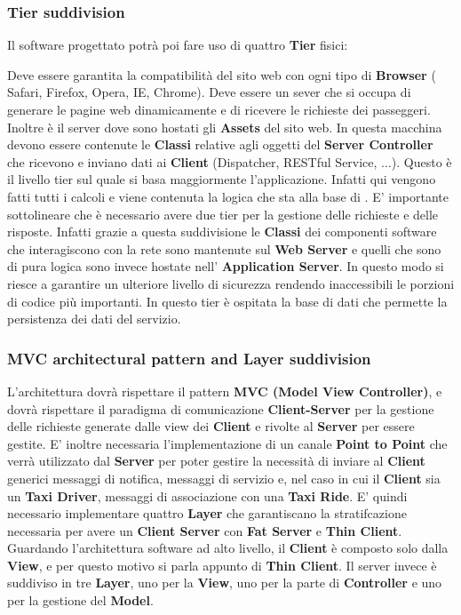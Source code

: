 \subsubsection{Tier suddivision}
Il software progettato potrà poi fare uso di quattro \textbf{Tier} fisici:
\begin{itemize}
	 Deve essere garantita la compatibilità del sito web con ogni tipo di \textbf{Browser} ( Safari, Firefox, Opera, IE, Chrome).
	 Deve essere un sever che si occupa di generare le pagine web dinamicamente e di ricevere le richieste dei passeggeri. Inoltre è il server dove sono hostati gli \textbf{Assets} del sito web. In questa macchina devono essere contenute le \textbf{Classi} relative agli oggetti del \textbf{Server Controller} che ricevono e inviano dati ai \textbf{Client} (Dispatcher, RESTful Service, ...).
	 Questo è il livello tier sul quale si basa maggiormente l'applicazione. 
	Infatti qui vengono fatti tutti i calcoli e viene contenuta la logica che sta alla base di \myTaxiService{}. 
	E' importante sottolineare che è necessario avere due tier per la gestione delle richieste e delle risposte. Infatti grazie a questa suddivisione le \textbf{Classi} dei componenti software che interagiscono con la rete sono mantenute sul \textbf{Web Server} e quelli che sono di pura logica sono invece hostate nell' \textbf{Application Server}.
	In questo modo si riesce a garantire un ulteriore livello di sicurezza rendendo inaccessibili le porzioni di codice più importanti.
	 In questo tier è ospitata la base di dati che permette la persistenza dei dati del servizio.
\end{itemize}
\subsubsection{MVC architectural pattern and Layer suddivision}
L'architettura dovrà rispettare il pattern \textbf{MVC (Model View Controller)}, e dovrà rispettare il paradigma di comunicazione \textbf{Client-Server} per la gestione delle richieste generate dalle view dei \textbf{Client} e rivolte al \textbf{Server} per essere gestite. 
E' inoltre necessaria l'implementazione di un canale \textbf{Point to Point} che verrà utilizzato dal \textbf{Server} per poter gestire la necessità di inviare al \textbf{Client} generici messaggi di notifica, messaggi di servizio e, nel caso in cui il \textbf{Client} sia un \textbf{Taxi Driver}, messaggi di associazione con una \textbf{Taxi Ride}.
E' quindi necessario implementare quattro \textbf{Layer} che garantiscano la stratifcazione necessaria per avere un \textbf{Client Server} con \textbf{Fat Server} e \textbf{Thin Client}.
Guardando l'architettura software ad alto livello, il \textbf{Client} è composto solo dalla \textbf{View}, e per questo motivo si parla appunto di \textbf{Thin Client}. 
Il server invece è suddiviso in tre \textbf{Layer}, uno per la \textbf{View}, uno per la parte di \textbf{Controller} e uno per la gestione del \textbf{Model}.
